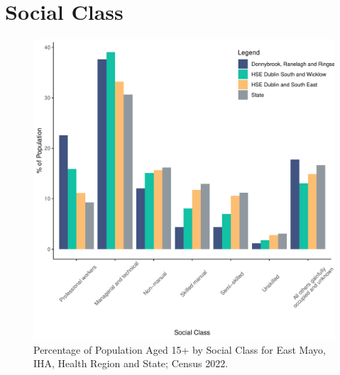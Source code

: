 \documentclass{article}
\begin{document}
\section{Social Class}\label{sect:SC}
\begin{figure}[H]
	\centering
	\includegraphics[width = 140mm]{../figures/SocialClassED.pdf}
	\caption{Percentage of Population Aged 15+ by Social Class for East Mayo, IHA, Health Region and State; Census 2022.}
	\label{fig:vbnv}
	\end{figure}
\end{document}

